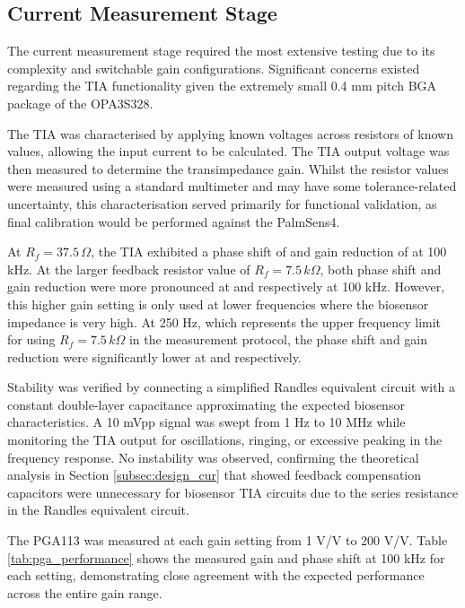 

\subsection{Current Measurement Stage} 
The current measurement stage required the most extensive testing due to its complexity and switchable gain configurations. Significant concerns existed regarding the TIA functionality given the extremely small 0.4 mm pitch BGA package of the OPA3S328.

The TIA was characterised by applying known voltages across resistors of known values, allowing the input current to be calculated. The TIA output voltage was then measured to determine the transimpedance gain. Whilst the resistor values were measured using a standard multimeter and may have some tolerance-related uncertainty, this characterisation served primarily for functional validation, as final calibration would be performed against the PalmSens4.

At $R_f = 37.5\,\Omega$, the TIA exhibited a phase shift of  and gain reduction of  at 100 kHz. At the larger feedback resistor value of $R_f = 7.5\,k\Omega$, both phase shift and gain reduction were more pronounced at  and  respectively at 100 kHz. However, this higher gain setting is only used at lower frequencies where the biosensor impedance is very high. At 250 Hz, which represents the upper frequency limit for using $R_f = 7.5\,k\Omega$ in the measurement protocol, the phase shift and gain reduction were significantly lower at  and  respectively.

Stability was verified by connecting a simplified Randles equivalent circuit with a constant double-layer capacitance approximating the expected biosensor characteristics. A 10 mVpp signal was swept from 1 Hz to 10 MHz while monitoring the TIA output for oscillations, ringing, or excessive peaking in the frequency response. No instability was observed, confirming the theoretical analysis in Section \ref{subsec:design_cur} that showed feedback compensation capacitors were unnecessary for biosensor TIA circuits due to the series resistance in the Randles equivalent circuit.

The PGA113 was measured at each gain setting from 1 V/V to 200 V/V. Table \ref{tab:pga_performance} shows the measured gain and phase shift at 100 kHz for each setting, demonstrating close agreement with the expected performance across the entire gain range.

